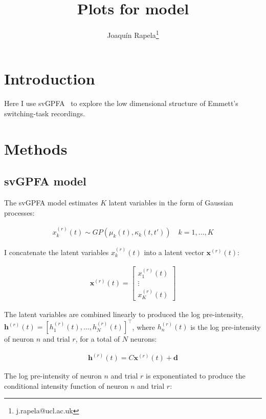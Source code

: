 \documentclass[12pt]{article}
\title{Plots for model \estNumber}
\author{Joaqu\'{i}n Rapela\thanks{j.rapela@ucl.ac.uk}}
\begin{document}
\maketitle

\section{Introduction}

Here I use svGPFA~\citep{dunckerAndSahani18} to explore the low dimensional
structure of Emmett's switching-task recordings.

\section{Methods}

\subsection{svGPFA model}

The svGPFA model estimates $K$ latent variables in the form of Gaussian
processes:

\begin{align*}
    x_k^{(r)}(t)\sim GP(\mu_k(t), \kappa_k(t,t'))\quad k=1,\ldots,K
\end{align*}

\noindent I concatenate the latent variables $x_k^{(r)}(t)$ into a latent vector
$\mathbf{x}^{(r)}(t)$:

\begin{align}
    \mathbf{x}^{(r)}(t)=\left[\begin{array}{c}
        x_1^{(r)}(t)\\
                            \vdots\\
                            x_K^{(r)}(t)
                        \end{array}\right]
    \label{eq:latentsVector}
\end{align}

The latent variables are combined linearly to produced the log pre-intensity,
$\mathbf{h}^{(r)}(t)=[h_1^{(r)}(t),\ldots,h_N^{(r)}(t)]^\intercal$, where
$h_n^{(r)}(t)$ is the log
pre-intensity of neuron $n$ and trial $r$, for a total of $N$ neurons:

\begin{align}
    \mathbf{h}^{(r)}(t)=C\mathbf{x}^{(r)}(t)+\mathbf{d}
    \label{eq:logPreIntensity}
\end{align}

The log pre-intensity of neuron $n$ and trial $r$ is exponentiated to produce the conditional
intensity function of neuron $n$ and trial $r$:
\end{document}
